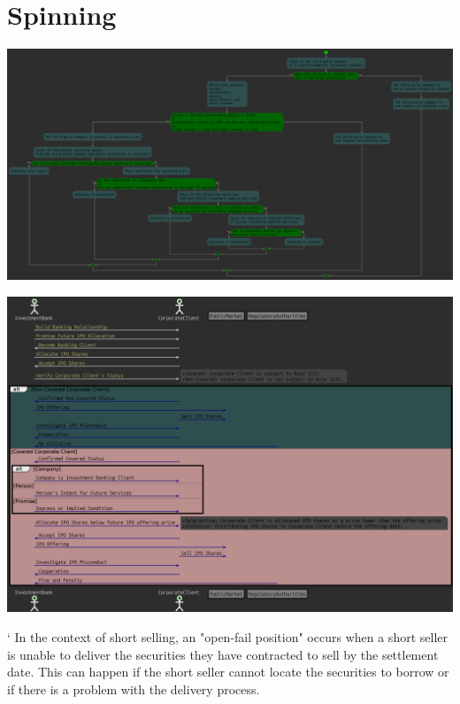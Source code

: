\documentclass[11pt]{article}
\begin{document}
\section{Spinning}
\label{sec:org3914ea5}
\begin{center}
\includegraphics[width=.9\linewidth]{./spinning_condition.png}
\end{center}
\begin{center}
\includegraphics[width=.9\linewidth]{./spinning.png}
\end{center}


       `
In the context of short selling, an "open-fail position" occurs when a short seller is unable to deliver the securities they have contracted to sell by the settlement date. This can happen if the short seller cannot locate the securities to borrow or if there is a problem with the delivery process.
\end{document}
